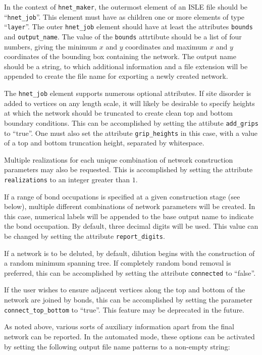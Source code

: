 \documentclass{article}
\begin{document}
In the context of \texttt{hnet\_maker}, the outermost element of an ISLE file
should be ``\texttt{hnet\_job}''. This element must have as children one or
more elements of type ``\texttt{layer}''. The outer \texttt{hnet\_job} element
should have at least the attributes \texttt{bounds} and \texttt{output\_name}.
The value of the \texttt{bounds} attrtibute should be a list of four numbers,
giving the minimum $x$ and $y$ coordinates and maximum $x$ and $y$ coordinates
of the bounding box containing the network. The output name should be a string,
to which additional information and a file extension will be appended to
create the file name for exporting a newly created network.

The \texttt{hnet\_job} element supports numerous optional attributes. If
site disorder is added to vertices on any length scale, it will likely be
desirable to specify heights at which the network should be truncated to create
clean top and bottom boundary conditions. This can be accomplished by
setting the attibute \texttt{add\_grips} to ``true''. One must also set the
attribute \texttt{grip\_heights} in this case, with a value of a top and bottom
truncation height, separated by whitespace.

Multiple realizations for each unique combination of network construction
parameters may also be requested. This is accomplished by setting the
attribute \texttt{realizations} to an integer greater than $1$.

If a range of bond occupations is specified at a given construction stage
(see below), multiple different combinations of network parameters will be
created. In this case, numerical labels will be appended to the base output
name to indicate the bond occupation. By default, three decimal digits will
be used. This value can be changed by setting the attribute
\texttt{report\_digits}.

If a network is to be deluted, by default, dilution begins with the
construction of a random minimum spanning tree. If completely random bond
removal is preferred, this can be accomplished by setting the attribute
\texttt{connected} to ``false''.

If the user wishes to ensure adjacent vertices along the top and bottom of
the network are joined by bonds, this can be accomplished by setting the
parameter \texttt{connect\_top\_bottom} to ``true''. This feature may be
deprecated in the future.

As noted above, various sorts of auxiliary information apart from the final
network can be reported. In the automated mode, these options can be activated
by setting the following output file name patterns to a non-empty string:
\end{document}
